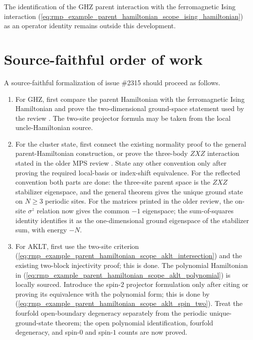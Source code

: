 \documentclass{article}
\begin{document}
The identification of the GHZ parent interaction with the ferromagnetic
Ising interaction (\ref{eq:rmp_example_parent_hamiltonian_scope_ising_hamiltonian})
as an operator identity remains outside this development.

\section{Source-faithful order of work}

A source-faithful formalization of issue \#2315 should proceed as follows.
\begin{enumerate}
    \item For GHZ, first compare the parent Hamiltonian with the ferromagnetic
          Ising Hamiltonian and prove the two-dimensional ground-space
          statement used by the review
          \cite[line~2205]{Cirac2021Matrix}. The two-site projector formula
          may be taken from the local uncle-Hamiltonian source.

    \item For the cluster state, first connect the existing normality proof to
          the general parent-Hamiltonian construction, or prove the three-body
          $ZXZ$ interaction stated in the older MPS review
          \cite[local TeX lines~374--387]{PerezGarcia2007MPSReps}. State any
          other convention only after proving the required local-basis or
          index-shift equivalence. For the reflected convention both parts are
          done: the three-site parent space is the $ZXZ$ stabilizer
          eigenspace, and the general theorem gives the unique ground state on
          $N\ge3$ periodic sites. For the matrices printed in the older review,
          the on-site $\sigma^z$ relation now gives the common $-1$ eigenspace;
          the sum-of-squares identity identifies it as the one-dimensional
          ground eigenspace of the stabilizer sum, with energy $-N$.

    \item For AKLT, first use the two-site criterion
          (\ref{eq:rmp_example_parent_hamiltonian_scope_aklt_intersection}) and
          the existing two-block injectivity proof; this is done. The
          polynomial Hamiltonian in
          (\ref{eq:rmp_example_parent_hamiltonian_scope_aklt_polynomial}) is
          locally sourced. Introduce the spin-$2$ projector formulation only
          after citing or proving its equivalence with the polynomial form;
          this is done by
          (\ref{eq:rmp_example_parent_hamiltonian_scope_aklt_spin_two}).
          Treat the fourfold open-boundary degeneracy separately from the
          periodic unique-ground-state theorem; the open polynomial identification,
          fourfold degeneracy, and spin-$0$ and spin-$1$ counts are now proved.
\end{enumerate}
\end{document}
